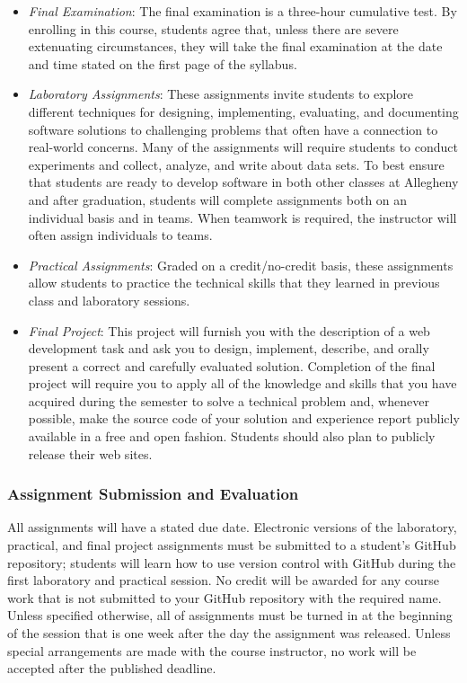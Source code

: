 \documentclass[11pt]{article}
\begin{document}
\begin{itemize}
  \item {\em Final Examination\/}: The final examination is a three-hour cumulative test. By enrolling in this course,
    students agree that, unless there are severe extenuating circumstances, they will take the final examination at the
    date and time stated on the first page of the syllabus.

  \item {\em Laboratory Assignments\/}: These assignments invite students to explore different techniques for designing,
    implementing, evaluating, and documenting software solutions to challenging problems that often have a connection to
    real-world concerns. Many of the assignments will require students to conduct experiments and collect, analyze, and
    write about data sets. To best ensure that students are ready to develop software in both other classes at Allegheny
    and after graduation, students will complete assignments both on an individual basis and in teams. When teamwork is
    required, the instructor will often assign individuals to teams.

  \item {\em Practical Assignments\/}: Graded on a credit/no-credit basis, these assignments allow students to practice
    the technical skills that they learned in previous class and laboratory sessions.

  \item {\em Final Project\/}: This project will furnish you with the description of a web development task and ask you
    to design, implement, describe, and orally present a correct and carefully evaluated solution. Completion of the
    final project will require you to apply all of the knowledge and skills that you have acquired during the semester
    to solve a technical problem and, whenever possible, make the source code of your solution and experience report
    publicly available in a free and open fashion. Students should also plan to publicly release their web sites.

\end{itemize}

\subsubsection*{Assignment Submission and Evaluation}

All assignments will have a stated due date. Electronic versions of the laboratory, practical, and final project
assignments must be submitted to a student's GitHub repository; students will learn how to use version control with
GitHub during the first laboratory and practical session. No credit will be awarded for any course work that is not
submitted to your GitHub repository with the required name. Unless specified otherwise, all of assignments must be
turned in at the beginning of the session that is one week after the day the assignment was released. Unless special
arrangements are made with the course instructor, no work will be accepted after the published deadline.
\end{document}
